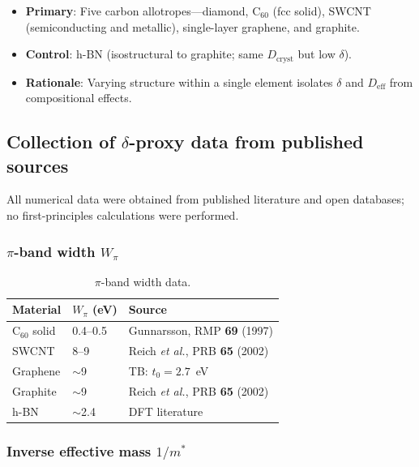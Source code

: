 \documentclass[twocolumn,showpacs,preprintnumbers,amsmath,amssymb,prb]{revtex4-2}
\begin{document}
\begin{itemize}
  \item \textbf{Primary}: Five carbon allotropes---diamond,
    C$_{60}$ (fcc solid), SWCNT (semiconducting and metallic),
    single-layer graphene, and graphite.
  \item \textbf{Control}: h-BN (isostructural to graphite; same
    $D_\mathrm{cryst}$ but low $\delta$).
  \item \textbf{Rationale}: Varying structure within a single element
    isolates $\delta$ and $D_\mathrm{eff}$ from compositional effects.
\end{itemize}

\subsection{Collection of $\delta$-proxy data from published sources}

All numerical data were obtained from published literature and open
databases; no first-principles calculations were performed.

\subsubsection{$\pi$-band width $W_\pi$}

\begin{table}[h]
\caption{$\pi$-band width data.}
\label{tab:bandwidth}
\begin{ruledtabular}
\begin{tabular}{lll}
  Material & $W_\pi$ (eV) & Source \\
  \hline
  C$_{60}$ solid & 0.4--0.5 & Gunnarsson, RMP \textbf{69} (1997) \\
  SWCNT & 8--9 & Reich \textit{et al.}, PRB \textbf{65} (2002) \\
  Graphene & $\sim$9 & TB: $t_0 = 2.7$~eV \\
  Graphite & $\sim$9 & Reich \textit{et al.}, PRB \textbf{65} (2002) \\
  h-BN & $\sim$2.4 & DFT literature \\
\end{tabular}
\end{ruledtabular}
\end{table}

\subsubsection{Inverse effective mass $1/m^*$}
\end{document}

